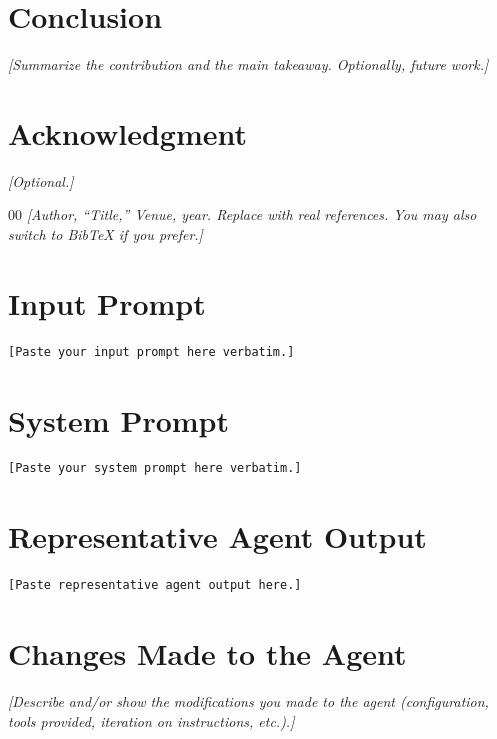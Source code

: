 \documentclass[conference]{IEEEtran}
\newcommand{\mainbodyendpage}{?}
\newcommand{\guide}[1]{{\color{gray}\textit{[#1]}}}
\begin{document}
\section{Conclusion}
\guide{Summarize the contribution and the main takeaway. Optionally, future
work.}

\section*{Acknowledgment}
\guide{Optional.}

\begin{thebibliography}{00}
 \guide{Author, ``Title,'' \emph{Venue}, year. Replace with real
references. You may also switch to BibTeX if you prefer.}
\end{thebibliography}

\xdef\mainbodyendpage{\thepage}

\appendices

\section{Input Prompt}
\begin{lstlisting}
[Paste your input prompt here verbatim.]
\end{lstlisting}

\section{System Prompt}
\begin{lstlisting}
[Paste your system prompt here verbatim.]
\end{lstlisting}

\section{Representative Agent Output}
\begin{lstlisting}
[Paste representative agent output here.]
\end{lstlisting}

\section{Changes Made to the Agent}
\guide{Describe and/or show the modifications you made to the agent
(configuration, tools provided, iteration on instructions, etc.).}
\end{document}
